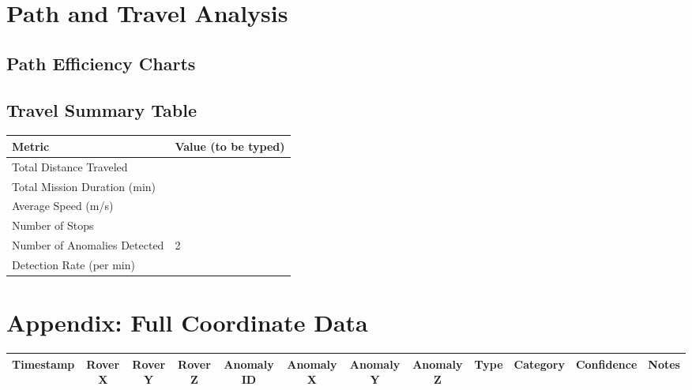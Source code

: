 \documentclass[12pt,a4paper]{report}
\begin{document}
\newpage



\chapter{Path and Travel Analysis}
\section{Path Efficiency Charts}
\begin{center}
\end{center}

\section{Travel Summary Table}
\begin{center}
\begin{tabularx}{0.95\textwidth}{|l|X|}
\hline
\textbf{Metric} & \textbf{Value (to be typed)} \\
\hline
Total Distance Traveled         &  \\
Total Mission Duration (min)    &  \\
Average Speed (m/s)             &  \\
Number of Stops                 &  \\
Number of Anomalies Detected    & 2 \\
Detection Rate (per min)        &  \\
\hline
\end{tabularx}
\end{center}


\appendix

\chapter{Appendix: Full Coordinate Data}
\begin{landscape}
\begin{longtable}{|c|c|c|c|c|c|c|c|c|c|c|c|}
\hline
\textbf{Timestamp} & \textbf{Rover X} & \textbf{Rover Y} & \textbf{Rover Z} & \textbf{Anomaly ID} & \textbf{Anomaly X} & \textbf{Anomaly Y} & \textbf{Anomaly Z} & \textbf{Type} & \textbf{Category} & \textbf{Confidence} & \textbf{Notes} \\
\hline
\end{longtable}
\end{landscape}
\end{document}
